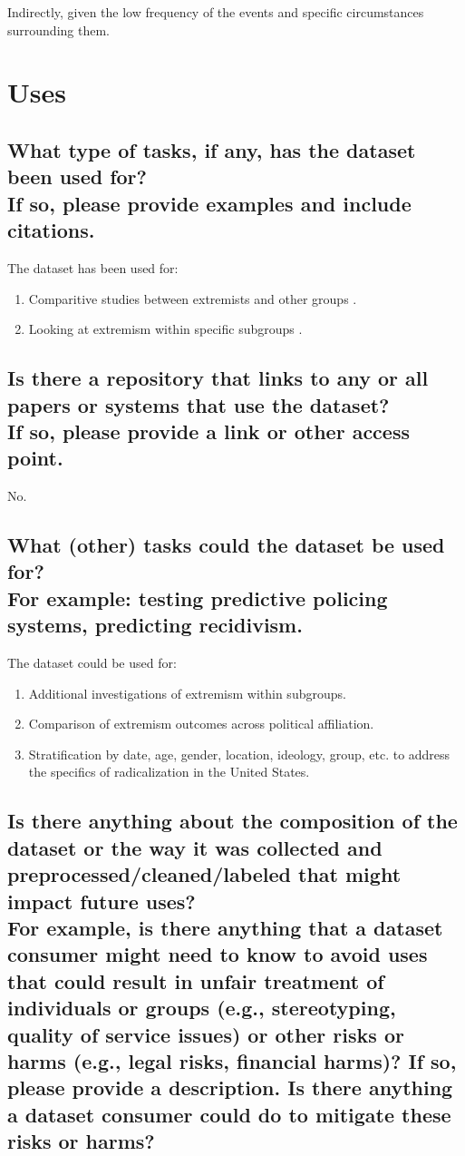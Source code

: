 \documentclass[letterpaper, 10 pt, conference]{ieeeconf}  %
\newcommand{\subtitle}[1]{{\\ \small \normalfont \color{purple} #1}}
\begin{document}
Indirectly, given the low frequency of the events and specific circumstances surrounding them.

\section{Uses}

\subsection{What type of tasks, if any, has the dataset been used for? \subtitle{If so, please provide examples and include citations.}}

The dataset has been used for:

\begin{enumerate}
    \item Comparitive studies between extremists and other groups \cite{pyrooz2017cut, al2017spotting}.
    \item Looking at extremism within specific subgroups \cite{haugstvedt2021armed, yon2019simply}.
\end{enumerate}

\subsection{Is there a repository that links to any or all papers or systems that use the dataset? \subtitle{If so, please provide a link or other access point. }}

No.

\subsection{What (other) tasks could the dataset be used for? \subtitle{For example: testing predictive policing systems, predicting recidivism.}}

The dataset could be used for:

\begin{enumerate}
    \item Additional investigations of extremism within subgroups.
    \item Comparison of extremism outcomes across political affiliation.
    \item Stratification by date, age, gender, location, ideology, group, etc. to address the specifics of radicalization in the United States.
\end{enumerate}

\subsection{Is there anything about the composition of the dataset or the way it was collected and preprocessed/cleaned/labeled that might impact future uses? \subtitle{For example, is there anything that a dataset consumer might need to know to avoid uses that could result in unfair treatment of individuals or groups (e.g., stereotyping, quality of service issues) or other risks or harms (e.g., legal risks, financial harms)? If so, please provide a description. Is there anything a dataset consumer could do to mitigate these risks or harms?}}
\end{document}
